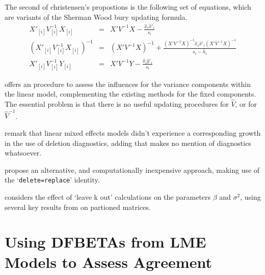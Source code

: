 \documentclass[12pt, a4paper]{report}
\theoremstyle{plain}
\theoremstyle{definition}
\theoremstyle{remark}
\begin{document}
	The second of christensen's propostions is the following set of
	equations, which are variants of the Sherman Wood bury updating
	formula.
	\begin{eqnarray}
	X'_{[i]}V_{[i]}^{-1}X_{[i]} &=& X' V^{-1}X -
	\frac{\hat{x}_{i}\hat{x}'_{i}}{s_{i}}\\
	(X'_{[i]}V_{[i]}^{-1}X_{[i]})^{-1} &=& (X' V^{-1}X)^{-1} +
	\frac{(X' V^{-1}X)^{-1}\hat{x}_{i}\hat{x}' _{i}
		(X' V^{-1}X)^{-1}}{s_{i}- \bar{h}_{i}}\\
	X'_{[i]}V_{[i]}^{-1}Y_{[i]} &=& X\prime V^{-1}Y -
	\frac{\hat{x}_{i}\hat{y}' _{i}}{s_{i}}
	\end{eqnarray}
	
	

	
\citet{HaslettDillane} offers an procedure to assess the influences for the variance components
	within the linear model, complementing the existing methods for the fixed components. The essential problem is that there is no useful updating procedures for $\hat{V}$, or for $\hat{V}^{-1}$.
		
\citet{HaslettDillane} remark that linear mixed effects models
		didn't experience a corresponding growth in the use of deletion
		diagnostics, adding that \citet{McCullSearle} makes no mention of
		diagnostics whatsoever.	
		
\citet{HaslettDillane} propose an alternative, and
	computationally inexpensive approach, making use of the
	`\texttt{delete=replace}' identity.
	
\citet{Haslett99} considers the effect of `leave k out'
	calculations on the parameters $\beta$ and $\sigma^{2}$, using
	several key results from \citet{HaslettHayes} on partioned
	matrices.

	
	


\section{Using DFBETAs from LME Models to Assess Agreement}
	
\end{document}
